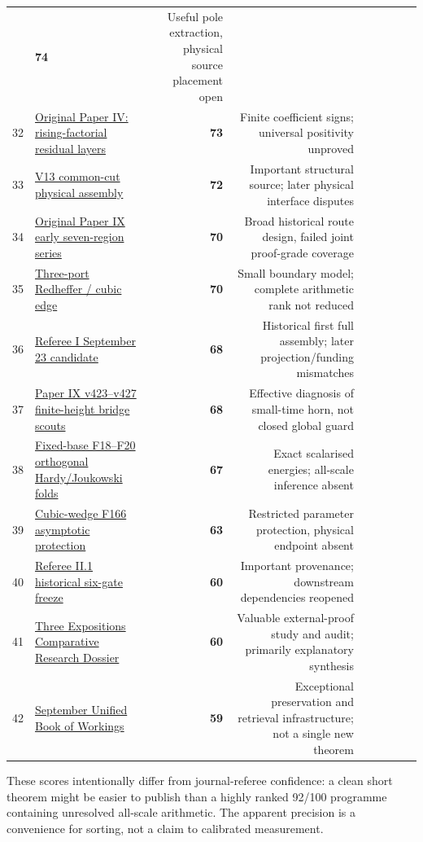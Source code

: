 \documentclass[
  10pt,
  a4paper,
  10pt,
  oneside,
  openany]{book}
\begin{document}
\begin{longtable}[]
{candidate} & \textbf{74} & Useful pole extraction, physical source
placement open \\
32 & \hyperref[ch-rising]{Original Paper IV: rising-factorial residual
layers} & \textbf{73} & Finite coefficient signs; universal positivity
unproved \\
33 & \hyperref[ch-weil]{V13 common-cut physical assembly} & \textbf{72}
& Important structural source; later physical interface disputes \\
34 & \hyperref[ch-paper-nine]{Original Paper IX early seven-region
series} & \textbf{70} & Broad historical route design, failed joint
proof-grade coverage \\
35 & \hyperref[ch-schur]{Three-port Redheffer / cubic edge} &
\textbf{70} & Small boundary model; complete arithmetic rank not
reduced \\
36 & \hyperref[ch-referee-history]{Referee I September 23 candidate} &
\textbf{68} & Historical first full assembly; later projection/funding
mismatches \\
37 & \hyperref[ch-paper-nine]{Paper IX v423--v427 finite-height bridge
scouts} & \textbf{68} & Effective diagnosis of small-time horn, not
closed global guard \\
38 & \hyperref[ch-folds]{Fixed-base F18--F20 orthogonal Hardy/Joukowski
folds} & \textbf{67} & Exact scalarised energies; all-scale inference
absent \\
39 & \hyperref[ch-relay-continuation]{Cubic-wedge F166 asymptotic
protection} & \textbf{63} & Restricted parameter protection, physical
endpoint absent \\
40 & \hyperref[atlas-physical]{Referee II.1 historical six-gate freeze}
& \textbf{60} & Important provenance; downstream dependencies
reopened \\
41 & \hyperref[atlas-frontier]{Three Expositions Comparative Research
Dossier} & \textbf{60} & Valuable external-proof study and audit;
primarily explanatory synthesis \\
42 & \hyperref[ch-overview]{September Unified Book of Workings} &
\textbf{59} & Exceptional preservation and retrieval infrastructure; not
a single new theorem \\
\end{longtable}

These scores intentionally differ from journal-referee confidence: a
clean short theorem might be easier to publish than a highly ranked
92/100 programme containing unresolved all-scale arithmetic. The
apparent precision is a convenience for sorting, not a claim to
calibrated measurement.
\end{document}
